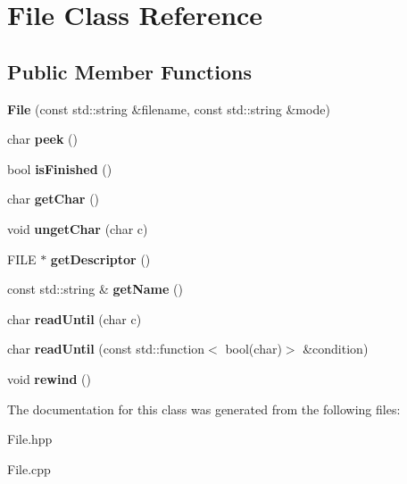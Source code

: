 \hypertarget{classFile}{}\section{File Class Reference}
\label{classFile}
\subsection*{Public Member Functions}
\begin{DoxyCompactItemize}
\item 
\mbox{\label{classFile_a8574f47a4eff4fc44bd60919c61610d3}} 
{\bfseries File} (const std\+::string \&filename, const std\+::string \&mode)
\item 
\mbox{\label{classFile_a60b843d95156968bb69e26e9171b2c57}} 
char {\bfseries peek} ()
\item 
\mbox{\label{classFile_a93457cfa8895f0eb185f4b47d3f36fd9}} 
bool {\bfseries is\+Finished} ()
\item 
\mbox{\label{classFile_a9377d79b66b40cef676db07e67871ca8}} 
char {\bfseries get\+Char} ()
\item 
\mbox{\label{classFile_aad8d72b0d1ebd8f10f6b031065c9271e}} 
void {\bfseries unget\+Char} (char c)
\item 
\mbox{\label{classFile_aa538ff162143bbfe6782b9ebe33426b4}} 
F\+I\+LE $\ast$ {\bfseries get\+Descriptor} ()
\item 
\mbox{\label{classFile_ac6d74a81bad59ad73501c3b89280b7e3}} 
const std\+::string \& {\bfseries get\+Name} ()
\item 
\mbox{\label{classFile_a86532a7e52e5c6a75ec98b3c46f77376}} 
char {\bfseries read\+Until} (char c)
\item 
\mbox{\label{classFile_ad5878720bf6a72548ec8f2fa5598ed45}} 
char {\bfseries read\+Until} (const std\+::function$<$ bool(char)$>$ \&condition)
\item 
\mbox{\label{classFile_a80c6611e0e9e89f45307f7606e643cfa}} 
void {\bfseries rewind} ()
\end{DoxyCompactItemize}


The documentation for this class was generated from the following files\+:\begin{DoxyCompactItemize}
\item 
File.\+hpp\item 
File.\+cpp\end{DoxyCompactItemize}
